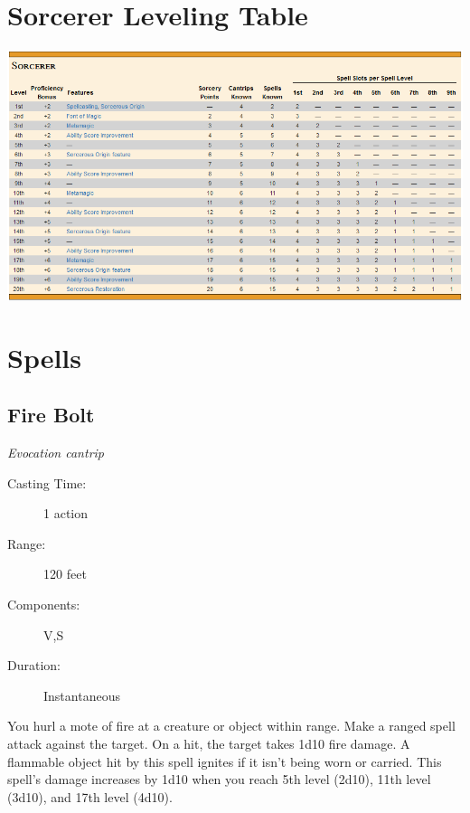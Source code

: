 \documentclass[letterpaper,10pt,twoside,twocolumn,openany]{book}
\begin{document}
\onecolumn
\section{Sorcerer Leveling Table}
\begin{center}
	\includegraphics[width=\linewidth]{img/SpellSlotTable.png}
\end{center}

\twocolumn

\section{Spells}

\subsection{Fire Bolt} \hypertarget{Fire Bolt}{}
\begin{hangingpar}
	\textit{Evocation cantrip}
\end{hangingpar}

\begin{description}
	\item[Casting Time:] 1 action
	\item[Range:] 120 feet
	\item[Components:] V,S
	\item[Duration:] Instantaneous
\end{description}

You hurl a mote of fire at a creature or object within range. Make a ranged spell attack against the target. On a hit, the target takes 1d10 fire damage. A flammable object hit by this spell ignites if it isn't being worn or carried.
This spell's damage increases by 1d10 when you reach 5th level (2d10), 11th level (3d10), and 17th level (4d10).
\end{document}
